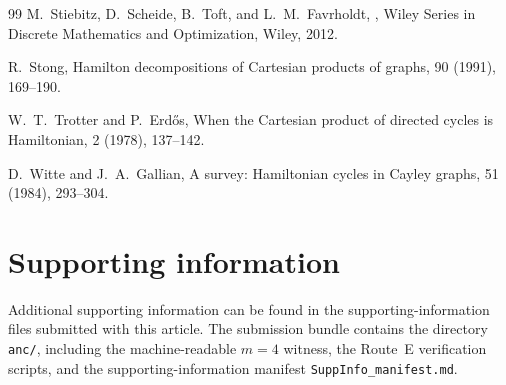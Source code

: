 \documentclass[11pt]{article}
\begin{document}
\begin{thebibliography}{99}
M.~Stiebitz, D.~Scheide, B.~Toft, and L.~M.~Favrholdt,
,
\newblock Wiley Series in Discrete Mathematics and Optimization, Wiley, 2012.

R.~Stong,
\newblock Hamilton decompositions of Cartesian products of graphs,
 90 (1991), 169--190.

W.~T.~Trotter and P.~Erd\H{o}s,
\newblock When the Cartesian product of directed cycles is Hamiltonian,
 2 (1978), 137--142.

D.~Witte and J.~A.~Gallian,
\newblock A survey: Hamiltonian cycles in Cayley graphs,
 51 (1984), 293--304.

\end{thebibliography}

\appendix


\section*{Supporting information}
Additional supporting information can be found in the supporting-information files submitted with this article.
The submission bundle contains the directory \texttt{anc/}, including the machine-readable $m=4$ witness, the Route~E verification scripts, and the supporting-information manifest \texttt{SuppInfo\_manifest.md}.
\end{document}
